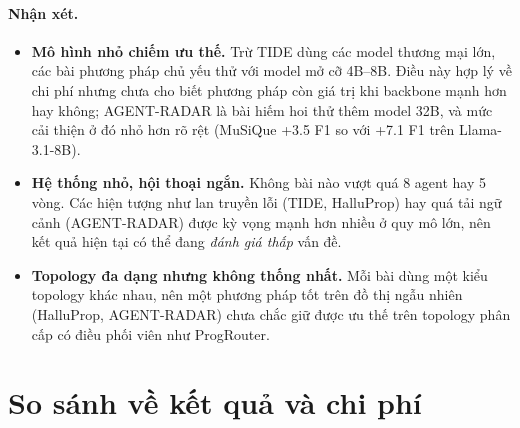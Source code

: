 \paragraph{Nhận xét.}
\begin{itemize}
  \item \textbf{Mô hình nhỏ chiếm ưu thế.} Trừ TIDE dùng các model thương mại lớn, các bài phương pháp chủ yếu thử với model mở cỡ 4B--8B. Điều này hợp lý về chi phí nhưng chưa cho biết phương pháp còn giá trị khi backbone mạnh hơn hay không; AGENT-RADAR là bài hiếm hoi thử thêm model 32B, và mức cải thiện ở đó nhỏ hơn rõ rệt (MuSiQue +3.5 F1 so với +7.1 F1 trên Llama-3.1-8B).
  \item \textbf{Hệ thống nhỏ, hội thoại ngắn.} Không bài nào vượt quá 8 agent hay 5 vòng. Các hiện tượng như lan truyền lỗi (TIDE, HalluProp) hay quá tải ngữ cảnh (AGENT-RADAR) được kỳ vọng mạnh hơn nhiều ở quy mô lớn, nên kết quả hiện tại có thể đang \emph{đánh giá thấp} vấn đề.
  \item \textbf{Topology đa dạng nhưng không thống nhất.} Mỗi bài dùng một kiểu topology khác nhau, nên một phương pháp tốt trên đồ thị ngẫu nhiên (HalluProp, AGENT-RADAR) chưa chắc giữ được ưu thế trên topology phân cấp có điều phối viên như ProgRouter.
\end{itemize}

\section{So sánh về kết quả và chi phí}
\label{sec:cmp-result}

